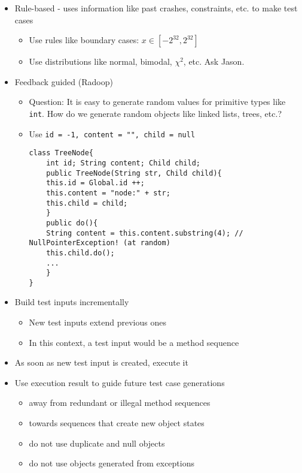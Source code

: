 \documentclass[12pt]{book}
\begin{document}
\begin{itemize}
\begin{itemize}
\begin{itemize}
        \end{itemize}
        \item Rule-based - uses information like past crashes, constraints, etc. to make test cases
        \begin{itemize}
            \item Use rules like boundary cases: $x\in [-2^{32}, 2^{32}]$
            \item Use distributions like normal, bimodal, $\chi^2$, etc. Ask Jason.
        \end{itemize} 
        \item Feedback guided (Radoop)
        \begin{itemize}
            \item Question: It is easy to generate random values for primitive types like \texttt{int}. How do we generate random objects like linked lists, trees, etc.?
            
            \item Use \texttt{id = -1, content = "", child = null}
            
            \begin{lstlisting}
class TreeNode{
    int id; String content; Child child;
    public TreeNode(String str, Child child){
    this.id = Global.id ++;
    this.content = "node:" + str;
    this.child = child;
    }
    public do(){
    String content = this.content.substring(4); // NullPointerException! (at random)
    this.child.do();
    ...
    }
}
            \end{lstlisting}
        \end{itemize} 

        \item Build test inputs incrementally
        \begin{itemize}
            \item New test inputs extend previous ones
            \item In this context, a test input would be a method sequence
        \end{itemize}

        \item As soon as new test input is created, execute it
        \item Use execution result to guide future test case generations
        \begin{itemize}
            \item away from redundant or illegal method sequences
            \item towards sequences that create new object states
            \item do not use duplicate and null objects
            \item do not use objects generated from exceptions
        \end{itemize}


\end{itemize}
\end{itemize}
\end{document}
